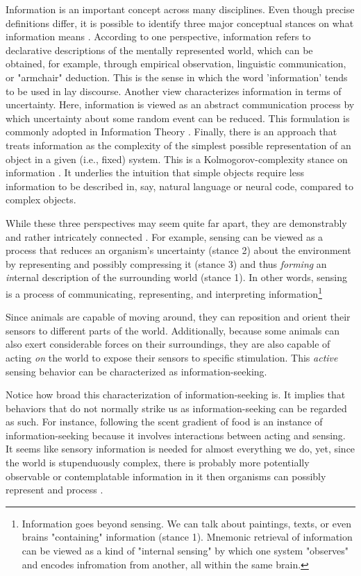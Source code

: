 Information is an important concept across many disciplines. Even though precise definitions differ, it is possible to identify three major conceptual stances on what information means \cite{adriaans_introduction_2008}. According to one perspective, information refers to declarative descriptions of the mentally represented world, which can be obtained, for example, through empirical observation, linguistic communication, or "armchair" deduction. This is the sense in which the word 'information' tends to be used in lay discourse. Another view characterizes information in terms of uncertainty. Here, information is viewed as an abstract communication process by which uncertainty about some random event can be reduced. This formulation is commonly adopted in Information Theory \cite{shannon_mathematical_1948}. Finally, there is an approach that treats information as the complexity of the simplest possible representation of an object in a given (i.e., fixed) system. This is a Kolmogorov-complexity stance on information \cite{kolmogorov1965three}. It underlies the intuition that simple objects require less information to be described in, say, natural language or neural code, compared to complex objects.

While these three perspectives may seem quite far apart, they are demonstrably and rather intricately connected \cite{adriaans_introduction_2008}. For example, sensing can be viewed as a process that reduces an organism's uncertainty (stance 2) about the environment by representing and possibly compressing it (stance 3) and thus \emph{forming} an \emph{in}ternal description of the surrounding world (stance 1). In other words, sensing is a process of communicating, representing, and interpreting information\footnote{Information goes beyond sensing. We can talk about paintings, texts, or even brains "containing" information (stance 1). Mnemonic retrieval of information can be viewed as a kind of "internal sensing" by which one system "observes" and encodes infromation from another, all within the same brain.}

Since animals are capable of moving around, they can reposition and orient their sensors to different parts of the world. Additionally, because some animals can also exert considerable forces on their surroundings, they are also capable of acting \emph{on} the world to expose their sensors to specific stimulation. This \emph{active} sensing behavior can be characterized as information-seeking. 

Notice how broad this characterization of information-seeking is. It implies that behaviors that do not normally strike us as information-seeking can be regarded as such. For instance, following the scent gradient of food is an instance of information-seeking because it involves interactions between acting and sensing. It seems like sensory information is needed for almost everything we do, yet, since the world is stupenduously complex, there is probably more potentially observable or contemplatable information in it then organisms can possibly represent and process \cite{kolmogorov1965three}. 

